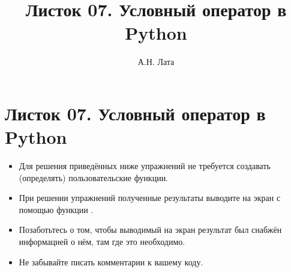 \documentclass[a4paper,12pt]{article}
\title{Листок 07. Условный оператор в Python}
\author{А.Н. Лата}
\theoremstyle{remark}
\begin{document}
\section*{\centering Листок 07. Условный оператор в Python}

\begin{exercisenote}[title=Замечания]
\begin{itemize}
    \item Для решения приведённых ниже упражнений не требуется создавать (определять) пользовательские функции.
    \item При решении упражнений полученные результаты выводите на экран с помощью функции {\color{blue}{print()}}.
    \item Позаботьтесь о том, чтобы выводимый на экран результат был снабжён информацией о нём, там где это необходимо.
    \item Не забывайте писать комментарии к вашему коду.
\end{itemize}
\end{exercisenote}
\end{document}
